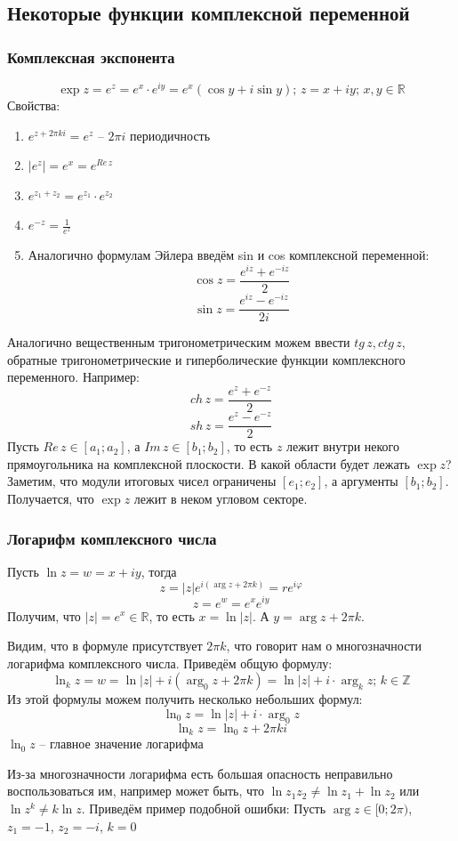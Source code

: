 \documentclass[twoside]{book}
\begin{document}
\subsection{Некоторые функции комплексной переменной}
\subsubsection{Комплексная экспонента}
$$\exp{z}=e^z=e^x \cdot e^{iy}=e^x(\cos{y}+i\sin{y}); \,z = x + iy;\,x, y\in\mathbb{R}$$
Свойства:
\begin{enumerate}
    \item $e^{z + 2\pi ki} = e^z$ -- $2\pi i$ периодичность
    \item $|e^z| = e^x=e^{Re\,z}$
    \item $e^{z_1 + z_2} = e^{z_1} \cdot e^{z_2}$
    \item $e^{-z} = \frac{1}{e^z}$
    \item Аналогично формулам Эйлера введём sin и cos комплексной переменной:
          $$\cos{z}=\frac{e^{iz}+e^{-iz}}{2}$$
          $$\sin{z}=\frac{e^{iz}-e^{-iz}}{2i}$$
\end{enumerate}
Аналогично вещественным тригонометрическим можем ввести $tg\,z, ctg\,z$, обратные тригонометрические и гиперболические функции комплексного переменного. Например:
$$ch\,z=\frac{e^z+e^{-z}}{2}$$
$$sh\,z=\frac{e^z-e^{-z}}{2}$$
Пусть $Re\,z\in[a_1; a_2]$, а $Im\,z\in[b_1; b_2]$, то есть $z$ лежит внутри некого прямоугольника на комплексной плоскости. В какой области будет лежать $\exp{z}$? Заметим, что модули итоговых чисел ограничены $[e_1; e_2]$, а аргументы $[b_1; b_2]$. Получается, что $\exp{z}$ лежит в неком угловом секторе.
\subsubsection{Логарифм комплексного числа}
Пусть $\ln{z}=w=x+iy$, тогда
$$z=|z|e^{i(\arg{z}+2\pi k)}=re^{i\varphi}$$
$$z=e^{w}=e^x e^{iy}$$
Получим, что $|z|=e^x\in\mathbb{R}$, то есть $x=\ln{|z|}$. А $y=\arg{z}+2\pi k$.

Видим, что в формуле присутствует $2\pi k$, что говорит нам о многозначности логарифма комплексного числа. Приведём общую формулу:
$$\ln_k{z}=w=\ln{|z|}+i(\arg_0{z}+2\pi k) = \ln{|z|}+i \cdot \arg_k{z}; \, k\in\mathbb{Z}$$
Из этой формулы можем получить несколько небольших формул:
$$\ln_0{z}=\ln{|z|}+i \cdot \arg_0{z}$$
$$\ln_k{z}=\ln_0{z}+2\pi ki$$
$\ln_0{z}$ -- главное значение логарифма

Из-за многозначности логарифма есть большая опасность неправильно воспользоваться им, например может быть, что $\ln{z_1z_2}\neq\ln{z_1} + \ln{z_2}$ или $\ln{z^k}\neq k\ln{z}$.
Приведём пример подобной ошибки:
Пусть $\arg{z}\in[0;2\pi)$, $z_1=-1$, $z_2=-i$, $k=0$
\end{document}
